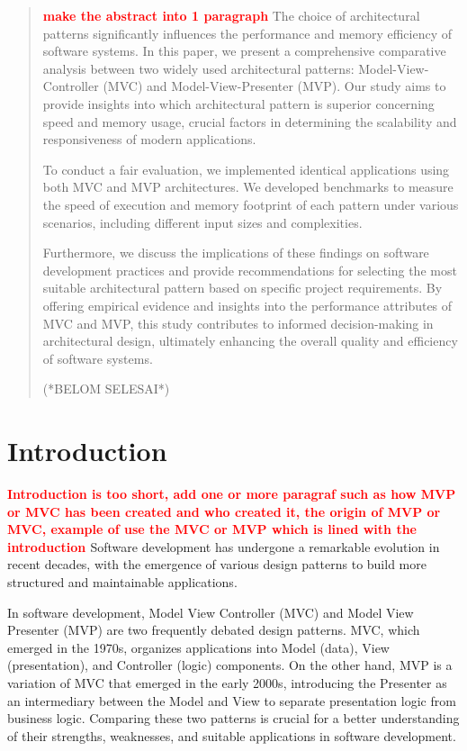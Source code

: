 \documentclass[conference]{IEEEtran}
\begin{document}
\begin{abstract}
\textbf{\textcolor{red}{make the abstract into 1 paragraph}}
The choice of architectural patterns significantly influences the performance and memory efficiency of software systems. In this paper, we present a comprehensive comparative analysis between two widely used architectural patterns: Model-View-Controller (MVC) and Model-View-Presenter (MVP). Our study aims to provide insights into which architectural pattern is superior concerning speed and memory usage, crucial factors in determining the scalability and responsiveness of modern applications.

To conduct a fair evaluation, we implemented identical applications using both MVC and MVP architectures. We developed benchmarks to measure the speed of execution and memory footprint of each pattern under various scenarios, including different input sizes and complexities. 

Furthermore, we discuss the implications of these findings on software development practices and provide recommendations for selecting the most suitable architectural pattern based on specific project requirements. By offering empirical evidence and insights into the performance attributes of MVC and MVP, this study contributes to informed decision-making in architectural design, ultimately enhancing the overall quality and efficiency of software systems. 

(*BELOM SELESAI*)
\end{abstract}

\section{Introduction}

\textbf{\textcolor{red}{Introduction is too short, add one or more paragraf such as how MVP or MVC has been created and who created it, the origin of MVP or MVC, example of use the MVC or MVP which is lined with the introduction	}}
Software development has undergone a remarkable evolution in recent decades, with the emergence of various design patterns to build more structured and maintainable applications. 

In software development, Model View Controller (MVC) and Model View Presenter (MVP) are two frequently debated design patterns. MVC, which emerged in the 1970s, organizes applications into Model (data), View (presentation), and Controller (logic) components. On the other hand, MVP is a variation of MVC that emerged in the early 2000s, introducing the Presenter as an intermediary between the Model and View to separate presentation logic from business logic. Comparing these two patterns is crucial for a better understanding of their strengths, weaknesses, and suitable applications in software development.
\end{document}
